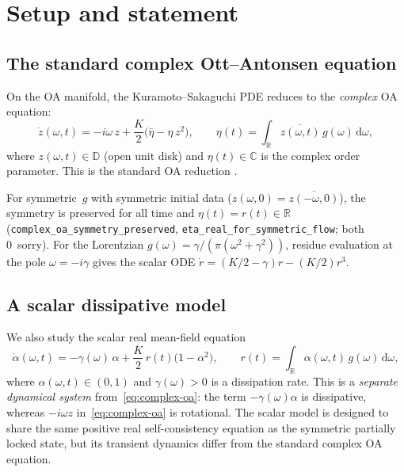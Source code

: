 \documentclass[11pt,a4paper]{article}
\theoremstyle{definition}
\newcommand{\D}{\mathbb{D}}
\newcommand{\R}{\mathbb{R}}
\newcommand{\C}{\mathbb{C}}
\begin{document}
\tableofcontents

\section{Setup and statement}

\subsection{The standard complex Ott--Antonsen equation}\label{sec:complex-oa}

On the OA manifold, the Kuramoto--Sakaguchi PDE reduces to the \emph{complex} OA equation:
\begin{equation}\label{eq:complex-oa}
\dot{z}(\omega,t) = -i\omega\,z + \frac{K}{2}\bigl(\bar\eta - \eta\,z^2\bigr), \qquad \eta(t) = \int_\R \overline{z(\omega,t)}\,g(\omega)\,\mathrm{d}\omega,
\end{equation}
where $z(\omega,t) \in \D$ (open unit disk) and $\eta(t) \in \C$ is the complex order parameter. This is the standard OA reduction \cite{ott-antonsen2008}.

For symmetric~$g$ with symmetric initial data ($z(\omega,0) = \overline{z(-\omega,0)}$), the symmetry is preserved for all time and $\eta(t) = r(t) \in \R$ (\texttt{complex\_oa\_symmetry\_preserved}, \texttt{eta\_real\_for\_symmetric\_flow}; both 0~sorry). For the Lorentzian $g(\omega) = \gamma/(\pi(\omega^2+\gamma^2))$, residue evaluation at the pole $\omega = -i\gamma$ gives the scalar ODE $\dot{r} = (K/2-\gamma)r - (K/2)r^3$.

\subsection{A scalar dissipative model}\label{sec:scalar-model}

We also study the scalar real mean-field equation
\begin{equation}\label{eq:oa}
\dot{\alpha}(\omega,t) = -\gamma(\omega)\,\alpha + \frac{K}{2}\,r(t)\bigl(1 - \alpha^2\bigr), \qquad r(t) = \int_\R \alpha(\omega,t)\,g(\omega)\,\mathrm{d}\omega,
\end{equation}
where $\alpha(\omega,t) \in (0,1)$ and $\gamma(\omega) > 0$ is a dissipation rate. This is a \emph{separate dynamical system} from~\eqref{eq:complex-oa}: the term $-\gamma(\omega)\alpha$ is dissipative, whereas $-i\omega z$ in~\eqref{eq:complex-oa} is rotational. The scalar model is designed to share the same positive real self-consistency equation as the symmetric partially locked state, but its transient dynamics differ from the standard complex OA equation.
\end{document}
